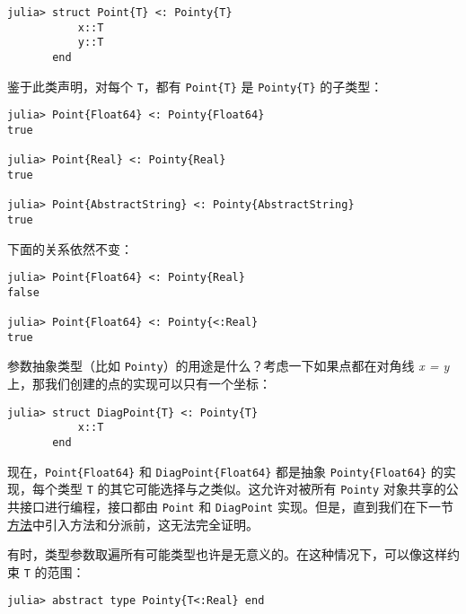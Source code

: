 \begin{verbatim}
julia> struct Point{T} <: Pointy{T}
           x::T
           y::T
       end
\end{verbatim}



鉴于此类声明，对每个 \texttt{T}，都有 \texttt{Point\{T\}} 是 \texttt{Pointy\{T\}} 的子类型：




\begin{verbatim}
julia> Point{Float64} <: Pointy{Float64}
true

julia> Point{Real} <: Pointy{Real}
true

julia> Point{AbstractString} <: Pointy{AbstractString}
true
\end{verbatim}



下面的关系依然不变：




\begin{verbatim}
julia> Point{Float64} <: Pointy{Real}
false

julia> Point{Float64} <: Pointy{<:Real}
true
\end{verbatim}



参数抽象类型（比如 \texttt{Pointy}）的用途是什么？考虑一下如果点都在对角线 \emph{x = y} 上，那我们创建的点的实现可以只有一个坐标：




\begin{verbatim}
julia> struct DiagPoint{T} <: Pointy{T}
           x::T
       end
\end{verbatim}



现在，\texttt{Point\{Float64\}} 和 \texttt{DiagPoint\{Float64\}} 都是抽象 \texttt{Pointy\{Float64\}} 的实现，每个类型 \texttt{T} 的其它可能选择与之类似。这允许对被所有 \texttt{Pointy} 对象共享的公共接口进行编程，接口都由 \texttt{Point} 和 \texttt{DiagPoint} 实现。但是，直到我们在下一节\hyperlink{3842379394166369470}{方法}中引入方法和分派前，这无法完全证明。



有时，类型参数取遍所有可能类型也许是无意义的。在这种情况下，可以像这样约束 \texttt{T} 的范围：




\begin{verbatim}
julia> abstract type Pointy{T<:Real} end
\end{verbatim}



